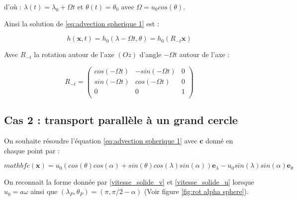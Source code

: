 d'où : $\lambda(t) = \lambda_0 + \Omega t$ et $\theta(t) = \theta_0$ avec $\Omega = u_0 cos ( \theta )$.

Ainsi la solution de \eqref{eq:advection spherique 1} est :

\begin{equation}
\label{eq: advection solution 1}
h( \mathbf{x}, t ) = h_0 ( \lambda - \Omega t, \theta ) = h_0 ( R_{-t}  \mathbf{x} )
\end{equation}

Avec $R_{-t}$ la rotation autour de l'axe $(Oz)$ d'angle $-\Omega t$ autour de l'axe :

\begin{equation}
\label{rotation}
R_{-t} = \begin{pmatrix}
cos \left( - \Omega t \right) & -sin \left( - \Omega t \right) & 0\\
sin \left( - \Omega t \right) & cos \left( - \Omega t \right)  & 0\\
0 & 0 & 1 \\
\end{pmatrix}
\end{equation}

\subsection{Cas 2 : transport parallèle à un grand cercle}

On souhaite résoudre l'équation \eqref{eq:advection spherique 1} avec $\mathbf{c}$ donné en chaque point par :

\begin{equation}
mathbf{c} ( \mathbf{x} ) = u_0 ( cos ( \theta) cos ( \alpha ) + sin( \theta) cos ( \lambda) sin( \alpha) ) \mathbf{e}_{\lambda} - u_0 sin( \lambda) sin( \alpha) \mathbf{e}_{\theta}
\label{eq:u0*cos alpha}
\end{equation}

On reconnait la forme donnée par \eqref{vitesse_solide_v} et \eqref{vitesse_solide_u} lorsque $u_0 = a \omega$ ainsi que $(\lambda_P, \theta_P) = (\pi, \pi/2 - \alpha)$ (Voir figure \ref{fig:rot alpha sphere}). 

